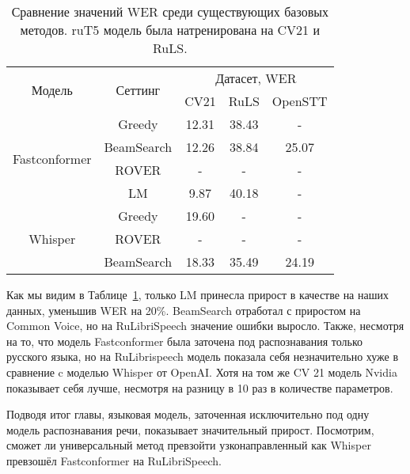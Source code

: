 \begin{table}[]
\centering
\caption{Сравнение значений WER среди существующих базовых методов. ruT5 модель была натренирована на CV21 и RuLS.}
\begin{tabular}{|c|c|ccc|}
\hline
\multirow{2}{*}{Модель}        & \multirow{2}{*}{Сеттинг}             & \multicolumn{3}{c|}{Датасет, WER}                                    \\ \cline{3-5} 
                               &                                      & \multicolumn{1}{c|}{CV21}  & \multicolumn{1}{c|}{RuLS}     & OpenSTT \\ \hline
\multirow{4}{*}{Fastconformer} & Greedy                               & \multicolumn{1}{c|}{12.31} & \multicolumn{1}{c|}{38.43}    & -       \\ \cline{2-5} 
                               & BeamSearch                           & \multicolumn{1}{c|}{12.26} & \multicolumn{1}{c|}{38.84}    & 25.07   \\ \cline{2-5}
                               & ROVER                                & \multicolumn{1}{c|}{-} & \multicolumn{1}{c|}{-}    & -       \\ \cline{2-5}
                               & LM                                   & \multicolumn{1}{c|}{9.87}  & \multicolumn{1}{c|}{40.18}    & -       \\ \hline 
\multirow{3}{*}{Whisper}       & Greedy                               & \multicolumn{1}{c|}{19.60} & \multicolumn{1}{c|}{-}    & -       \\ \cline{2-5} 
                               & ROVER                                & \multicolumn{1}{c|}{-} & \multicolumn{1}{c|}{-}    & -       \\ \cline{2-5}
                               & BeamSearch                           & \multicolumn{1}{c|}{18.33} & \multicolumn{1}{c|}{35.49}    & 24.19   \\ \hline
                               
\end{tabular}
\label{tab:res_comp}
\end{table}

Как мы видим в Таблице~\ref{tab:res_comp}, только LM принесла прирост в качестве на наших данных, уменьшив WER на 20\%.
BeamSearch отработал с приростом на Common Voice, но на RuLibriSpeech значение ошибки выросло.
Также, несмотря на то, что модель Fastconformer была заточена под распознавания только русского языка, но на RuLibrispeech модель показала себя незначительно хуже в сравнение c моделью Whisper от OpenAI.
Хотя на том же CV 21 модель Nvidia показывает себя лучше, несмотря на разницу в 10 раз в количестве параметров.

Подводя итог главы, языковая модель, заточенная исключительно под одну модель распознавания речи, показывает значительный прирост.
Посмотрим, сможет ли универсальный метод превзойти узконаправленный как Whisper превзошёл Fastconformer на RuLibriSpeech.